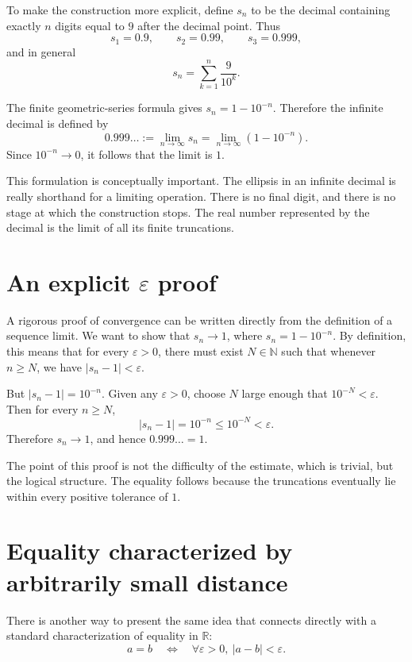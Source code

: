 \documentclass{essay}
\begin{document}
To make the construction more explicit, define \(s_{n}\) to be the decimal containing exactly \(n\) digits equal to \(9\) after the decimal point. Thus
\[ s_{1}=0.9,\qquad s_{2}=0.99,\qquad s_{3}=0.999, \]
and in general
\[ s_{n}=\sum_{k=1}^{n}\frac{9}{10^{k}}. \]

The finite geometric-series formula gives \(s_{n}=1-10^{-n}\). Therefore the infinite decimal is defined by
\[ 0.999\ldots := \lim_{n\to\infty}s_{n} = \lim_{n\to\infty}(1-10^{-n}). \]
Since \(10^{-n}\to0\), it follows that the limit is \(1\).

This formulation is conceptually important. The ellipsis in an infinite decimal is really shorthand for a limiting operation. There is no final digit, and there is no stage at which the construction stops. The real number represented by the decimal is the limit of all its finite truncations.

\section{An explicit \texorpdfstring{\(\varepsilon\)}{epsilon} proof}

A rigorous proof of convergence can be written directly from the definition of a sequence limit. We want to show that \(s_{n}\to1\), where \(s_{n}=1-10^{-n}\). By definition, this means that for every \(\varepsilon>0\), there must exist \(N\in\mathbb{N}\) such that whenever \(n\ge N\), we have \(|s_{n}-1|<\varepsilon\).

But \(|s_{n}-1|=10^{-n}\). Given any \(\varepsilon>0\), choose \(N\) large enough that \(10^{-N}<\varepsilon\). Then for every \(n\ge N\),
\[ |s_{n}-1|=10^{-n}\le 10^{-N}<\varepsilon. \]
Therefore \(s_{n}\to1\), and hence \(0.999\ldots=1\).

The point of this proof is not the difficulty of the estimate, which is trivial, but the logical structure. The equality follows because the truncations eventually lie within every positive tolerance of \(1\).

\section{Equality characterized by arbitrarily small distance}

There is another way to present the same idea that connects directly with a standard characterization of equality in \(\mathbb{R}\):
\[ a=b \quad\Longleftrightarrow\quad \forall\varepsilon>0,\ |a-b|<\varepsilon. \]
\end{document}
